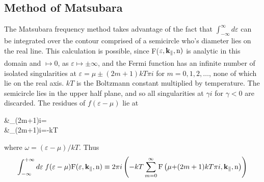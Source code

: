 \documentclass[a4paper, 12pt]{article}
\begin{document}
	\subsection{Method of Matsubara}
\par The Matsubara frequency method takes advantage of the fact that $\int_{-\infty}^{\infty}d\varepsilon$ can be integrated over the contour comprised of a semicircle who's diameter lies on the real line. This calculation is possible, since F($\varepsilon, \bf k_\parallel, \rm n)$ is analytic in this domain and $\longmapsto 0$, as $\varepsilon \longmapsto \pm \infty$\textcolor{blue}{\textsuperscript{\cite{tall}}}, and the Fermi function
has an infinite number of isolated singularities at $\varepsilon = \mu \pm (2m+1)kT\pi i$ for $m=0,1,2,\dots$, none of which lie on the real axis. $kT$ is the Boltzmann constant multiplied by temperature. The semicircle lies in the upper half plane, and so all singularities at $\gamma i$ for $\gamma < 0$ are discarded. 
The residues of $f(\varepsilon - \mu)$ lie at
	\begin{flalign}
	&\lim_{\omega \rightarrow(2m+1)\pi i}=\\&\lim_{\omega \rightarrow(2m+1)\pi i}=-kT
\end{flalign}
where $\omega = (\varepsilon-\mu)/kT$.
Thus
\begin{equation}\label{matsu}
	\int_{-\infty}^{+\infty}  d\varepsilon\; f(\varepsilon-\mu){\rm F}(\varepsilon, {\bf k}_\parallel, {\rm n})\equiv 2\pi i\left(-kT\sum_{m=0}^\infty {\rm F}\left(\mu{ + (2m+1) kT\pi i}, \rm\bf k_\parallel, \rm n\right)\right)
\end{equation}
\end{document}
